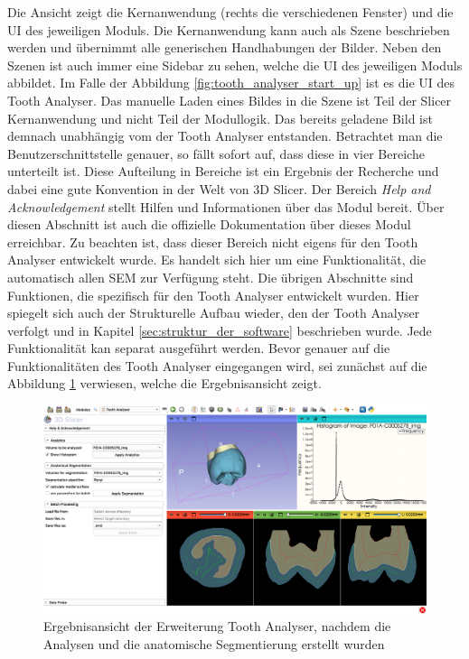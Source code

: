 Die Ansicht zeigt die Kernanwendung (rechts die verschiedenen Fenster) und die
\ac{UI} des jeweiligen Moduls. Die Kernanwendung kann auch als Szene beschrieben
werden und übernimmt alle generischen Handhabungen der Bilder. Neben den Szenen ist
auch immer eine Sidebar zu sehen, welche die \ac{UI} des jeweiligen Moduls abbildet.
Im Falle der Abbildung \ref{fig:tooth_analyser_start_up} ist es die \ac{UI} des Tooth
Analyser. Das manuelle Laden eines Bildes in die Szene ist Teil der Slicer
Kernanwendung und nicht Teil der Modullogik. Das bereits geladene Bild ist demnach
unabhängig vom der Tooth Analyser entstanden. Betrachtet man die
Benutzerschnittstelle genauer, so fällt sofort auf, dass diese in vier Bereiche
unterteilt ist. Diese Aufteilung in Bereiche ist ein Ergebnis der Recherche und dabei
eine gute Konvention in der Welt von 3D Slicer. Der Bereich \textit{Help and
Acknowledgement} stellt Hilfen und Informationen über das Modul bereit. Über
diesen Abschnitt ist auch die offizielle Dokumentation über dieses Modul
erreichbar. Zu beachten ist, dass dieser Bereich nicht eigens für den Tooth
Analyser entwickelt wurde. Es handelt sich hier um eine Funktionalität, die
automatisch allen \ac{SEM} zur Verfügung steht. Die übrigen Abschnitte sind
Funktionen, die spezifisch für den Tooth Analyser entwickelt wurden. Hier
spiegelt sich auch der Strukturelle Aufbau wieder, den der Tooth Analyser verfolgt
und in Kapitel \ref{sec:struktur_der_software} beschrieben wurde. Jede
Funktionalität kan separat ausgeführt werden. Bevor genauer auf die Funktionalitäten
des Tooth Analyser eingegangen wird, sei zunächst auf die Abbildung
\ref{fig:tooth_analyser_full_view} verwiesen, welche die Ergebnisansicht zeigt.

\begin{figure}[h]
	\centering
	\includegraphics[scale=0.2, width=\textwidth]{img/toothAnalyserFullView.png}
	\caption{Ergebnisansicht der Erweiterung Tooth Analyser, nachdem die Analysen und
	die anatomische Segmentierung erstellt wurden}
	\label{fig:tooth_analyser_full_view}
\end{figure}

